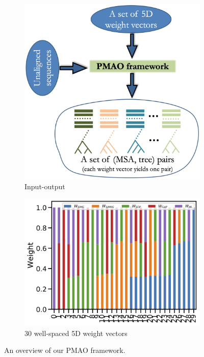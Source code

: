 \begin{figure}[!htbp]\begin{adjustwidth}{-1.1cm}{}
		\centering
		\begin{subfigure}[b]{0.4\textwidth}
			\includegraphics[width=\textwidth]{PMAO}
			\caption{Input-output}
	   \end{subfigure}		
		\begin{subfigure}[b]{0.5\textwidth}
		\includegraphics[width=\textwidth]{30-weight}
		\caption{30 well-spaced 5D weight vectors}
		\label{fig:weight}
		\end{subfigure}
	\end{adjustwidth}
	\caption{An overview of our PMAO framework.}
	\label{fig:PMAO}
\end{figure}

